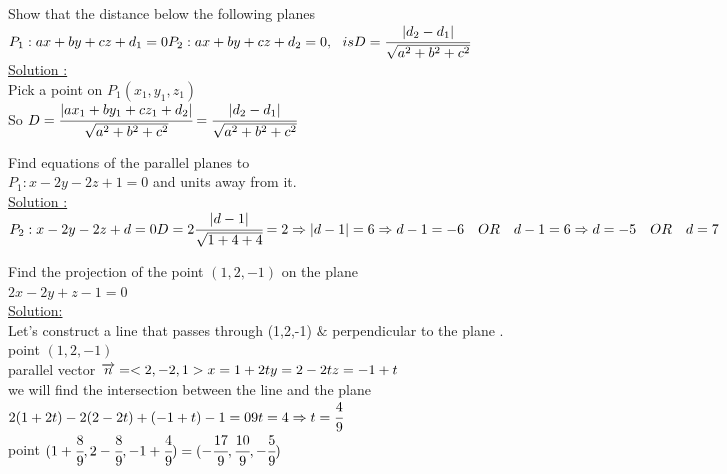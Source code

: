 \begin{example}
Show that the distance below the following planes \\
$P_1 : ax+by+cz+d_1=0 \\
P_2 : ax+by+cz+d_2=0 ,~~is  \\  D=\cfrac{|d_2-d_1|}{\sqrt{a^2+b^2+c^2}}$\\
{\color{smalt(darkpowderblue)}\underline{Solution :}} \\
Pick a point on $P_1(x_1,y_1,z_1)$ \\ So 
$D= {\cfrac{|ax_1+by_1+cz_1+d_2|}{\sqrt{a^2+b^2+c^2}} \\ = \cfrac{|d_2-d_1|}{\sqrt{a^2+b^2+c^2}}}$
\end{example}
\noindent{\color{smalt(darkpowderblue)}\rule{\linewidth}{.2mm}}
\begin{example}
Find equations of the parallel planes to \\ 
$P_1 : x-2y-2z+1=0 $ and units away from it.\\
{\color{smalt(darkpowderblue)}\underline{Solution :}} \\
$P_2 : x-2y-2z+d=0 \\ D=2 \\ {\cfrac{|d-1|}{\sqrt{1+4+4}} }=2\\ \Rightarrow |d-1|=6 \\
\Rightarrow  d-1 = -6 ~~~ OR~~~ d-1=6 \\
\Rightarrow d=-5 ~~~ OR ~~~ d=7$ 
\end{example}
\noindent{\color{smalt(darkpowderblue)}\rule{\linewidth}{.2mm}}
\begin{example}
Find the projection of the point
$(1,2,-1)$ on the plane \\$ 2x-2y+z-1=0 $\\
{\color{smalt(darkpowderblue)}\underline{Solution:}} \\
Let's construct a line that passes through (1,2,-1) $\&$ perpendicular to the plane .\\
point $(1,2,-1)$ \\
parallel vector $\overrightarrow{n}=<2,-2,1> \\
x=1+2t \\ 
y=2-2t \\
z=-1+t $ \\
we will find the intersection between the line and the plane \\
$2(1+2t)-2(2-2t)+(-1+t)-1=0 \\ 9t=4 \Rightarrow t=\cfrac{4}{9}$ \\
point $(1+\cfrac{8}{9} , 2-\cfrac{8}{9} , -1 + \cfrac{4}{9}) = (-\cfrac{17}{9},\cfrac{10}{9} , -\cfrac{5}{9})$
\end{example}
